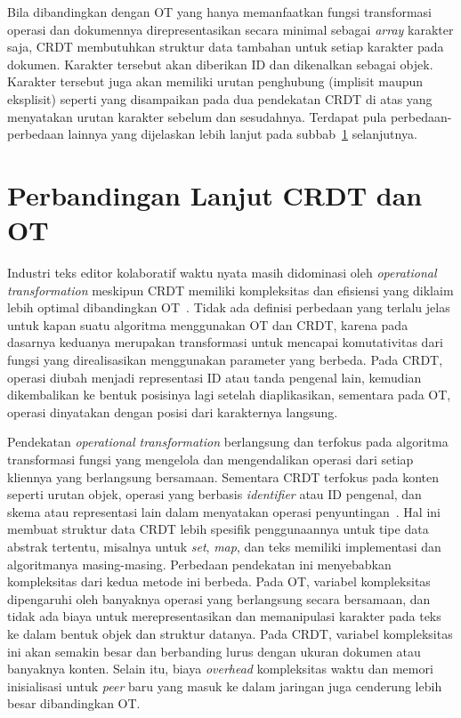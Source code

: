 Bila dibandingkan dengan OT yang hanya memanfaatkan fungsi transformasi operasi dan dokumennya direpresentasikan secara minimal sebagai \textit{array} karakter saja, CRDT membutuhkan struktur data tambahan untuk setiap karakter pada dokumen. Karakter tersebut akan diberikan ID dan dikenalkan sebagai objek. Karakter tersebut juga akan memiliki urutan penghubung (implisit maupun eksplisit) seperti yang disampaikan pada dua pendekatan CRDT di atas yang menyatakan urutan karakter sebelum dan sesudahnya. Terdapat pula perbedaan-perbedaan lainnya yang dijelaskan lebih lanjut pada subbab~\ref{sec:perbandingan} selanjutnya.

\section{Perbandingan Lanjut CRDT dan OT}
\label{sec:perbandingan}

Industri teks editor kolaboratif waktu nyata masih didominasi oleh \textit{operational transformation} meskipun CRDT memiliki kompleksitas dan efisiensi yang diklaim lebih optimal dibandingkan OT~\citep{Sun2019third}. Tidak ada definisi perbedaan yang terlalu jelas untuk kapan suatu algoritma menggunakan OT dan CRDT, karena pada dasarnya keduanya merupakan transformasi untuk mencapai komutativitas dari fungsi yang direalisasikan menggunakan parameter yang berbeda. Pada CRDT, operasi diubah menjadi representasi ID atau tanda pengenal lain, kemudian dikembalikan ke bentuk posisinya lagi setelah diaplikasikan, sementara pada OT, operasi dinyatakan dengan posisi dari karakternya langsung.

Pendekatan \textit{operational transformation} berlangsung dan terfokus pada algoritma transformasi fungsi yang mengelola dan mengendalikan operasi dari setiap kliennya yang berlangsung bersamaan. Sementara CRDT terfokus pada konten seperti urutan objek, operasi yang berbasis \textit{identifier} atau ID pengenal, dan skema atau representasi lain dalam menyatakan operasi penyuntingan~\citep{Sun2019Second, Sun2019First}. Hal ini membuat struktur data CRDT lebih spesifik penggunaannya untuk tipe data abstrak tertentu, misalnya untuk \textit{set}, \textit{map}, dan teks memiliki implementasi dan algoritmanya masing-masing. Perbedaan pendekatan ini menyebabkan kompleksitas dari kedua metode ini berbeda. Pada OT, variabel kompleksitas dipengaruhi oleh banyaknya operasi yang berlangsung secara bersamaan, dan tidak ada biaya untuk merepresentasikan dan memanipulasi karakter pada teks ke dalam bentuk objek dan struktur datanya. Pada CRDT, variabel kompleksitas ini akan semakin besar dan berbanding lurus dengan ukuran dokumen atau banyaknya konten. Selain itu, biaya \textit{overhead} kompleksitas waktu dan memori inisialisasi untuk \textit{peer} baru yang masuk ke dalam jaringan juga cenderung lebih besar dibandingkan OT.


